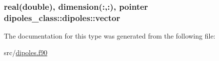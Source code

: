 \hypertarget{structdipoles__class_1_1dipoles_a658a483ea027a653fefdd02718773ea6}{
\subsubsection[{vector}]{\setlength{\rightskip}{0pt plus 5cm}real(double), dimension(\+:,\+:), pointer dipoles\+\_\+class\+::dipoles\+::vector\hspace{0.3cm}{\ttfamily [private]}}}\label{structdipoles__class_1_1dipoles_a658a483ea027a653fefdd02718773ea6}


The documentation for this type was generated from the following file\+:\begin{DoxyCompactItemize}
\item 
src/\hyperlink{dipoles_8f90}{dipoles.\+f90}\end{DoxyCompactItemize}
